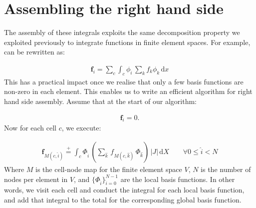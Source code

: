 \documentclass{book}
\begin{document}
\section{Assembling the right hand side}
\label{\detokenize{6_finite_element_problems:assembling-the-right-hand-side}}
The assembly of these integrals exploits the same decomposition
property we exploited previously to integrate functions in finite
element spaces. For example, {\hyperref[\detokenize{6_finite_element_problems:equation-eq_rhs}]{}} can be rewritten as:

\label{\detokenize{6_finite_element_problems:equation-6_finite_element_problems:4}}\begin{equation}\label{equation:6_finite_element_problems:6_finite_element_problems:4}
\begin{split}\mathbf{f}_i = \sum_c \int_c \phi_i \,\sum_k f_k\phi_k\,  \mathrm{d} x\end{split}
\end{equation}
This has a practical impact once we realise that only a few basis
functions are non-zero in each element. This enables us to write an
efficient algorithm for right hand side assembly. Assume that at the
start of our algorithm:

\label{\detokenize{6_finite_element_problems:equation-6_finite_element_problems:5}}\begin{equation}\label{equation:6_finite_element_problems:6_finite_element_problems:5}
\begin{split}\mathbf{f}_i = 0.\end{split}
\end{equation}
Now for each cell \(c\), we execute:

\label{\detokenize{6_finite_element_problems:equation-6_finite_element_problems:6}}\begin{equation}\label{equation:6_finite_element_problems:6_finite_element_problems:6}
\begin{split}\mathbf{f}_{M(c, \hat{i})} \stackrel{+}{=} \int_c \Phi_{\hat{i}}\, \left(\sum_{\hat{k}}\,f_{M(c,\hat{k})}\,\Phi_{\hat{k}}\right)\,|J|\,\mathrm{d} X \qquad \forall 0 \leq \hat{i} < N\end{split}
\end{equation}
Where \(M\) is the cell-node map for the finite element space \(V\), \(N\)
is the number of nodes per element in \(V\), and
\(\{\Phi_{\hat{i}}\}_{\hat{i}=0}^{N-1}\) are the local basis
functions. In other words, we visit each cell and conduct the integral
for each local basis function, and add that integral to the total for
the corresponding global basis function.
\end{document}
